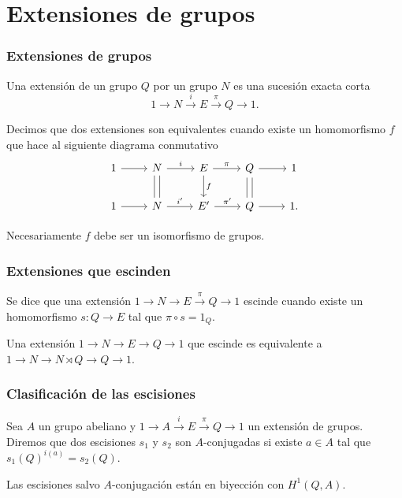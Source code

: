 \documentclass[
	11pt, %
]{beamer}
\newcommand{\homo}[3]{#1\colon #2\to #3}
\newcommand{\extension}[5]{1\xrightarrow{} #3 \xrightarrow{#1} #4\xrightarrow{#2} #5 \xrightarrow{} 1}
\begin{document}
\section{Extensiones de grupos}

\begin{frame}[fragile]
	\frametitle{Extensiones de grupos}
	
	Una extensión de un grupo $Q$ por un grupo $N$ es una sucesión exacta corta $$\extension i \pi N E Q.$$
	
	Decimos que dos extensiones son equivalentes cuando existe un homomorfismo $f$ que hace al siguiente diagrama conmutativo
	\[\begin{tikzcd}
		1 & N & E & Q & 1 \\
		1 & N & {E'} & Q & 1.
		\arrow[from=1-1, to=1-2]
		\arrow["i", from=1-2, to=1-3]
		\arrow["\pi", from=1-3, to=1-4]
		\arrow[from=1-4, to=1-5]
		\arrow[from=2-1, to=2-2]
		\arrow["{i'}", from=2-2, to=2-3]
		\arrow["{\pi'}", from=2-3, to=2-4]
		\arrow[from=2-4, to=2-5]
		\arrow[shift left=1, no head, from=1-4, to=2-4]
		\arrow[shift left=1, no head, from=2-4, to=1-4]
		\arrow["f", from=1-3, to=2-3]
		\arrow[shift left=1, no head, from=1-2, to=2-2]
		\arrow[shift left=1, no head, from=2-2, to=1-2]
	\end{tikzcd}\]
	
	Necesariamente $f$ debe ser un isomorfismo de grupos.
	
\end{frame}

\begin{frame}
	\frametitle{Extensiones que escinden}
	
	\begin{definition}
		Se dice que una extensión $\extension {} {\pi} N E Q$ escinde cuando existe un homomorfismo $\homo s Q E$ tal que $\pi \circ s = 1_Q$. %
	\end{definition}
	
	\begin{theorem}
		Una extensión $\extension {}{} N E Q$ que escinde es equivalente a $\extension {}{} N {N\rtimes Q} Q$.
	\end{theorem}	
\end{frame}

\begin{frame}
	\frametitle{Clasificación de las escisiones}
	\begin{definition}
		Sea $A$ un grupo abeliano y $\extension i \pi A E Q$ un extensión de grupos. Diremos que dos escisiones $s_1$ y $s_2$ son $A$-conjugadas si existe $a\in A$ tal que $s_1(Q)^{i(a)} = s_2(Q)$.
	\end{definition}
	
	\begin{theorem}
		Las escisiones salvo $A$-conjugación están en biyección con $H^1(Q,A)$.
	\end{theorem}
\end{frame}
\end{document}
